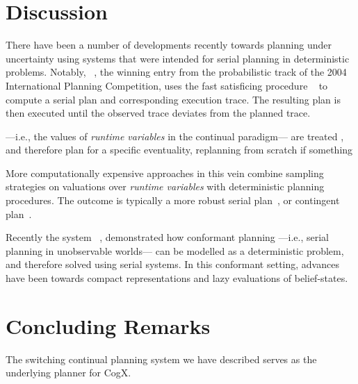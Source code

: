 \documentclass[letterpaper]{article}
\begin{document}
\section{Discussion}

There have been a number of developments recently towards planning
under uncertainty using systems that were intended for serial planning
in deterministic problems.  Notably,
~\cite{yoon:etal:2007}, the winning entry from the
probabilistic track of the 2004 International Planning Competition,
uses the fast satisficing procedure
~\cite{hoffmann:nebel:2001} to compute a serial plan and
corresponding execution trace. The resulting plan is then executed
until the observed trace deviates from the planned trace.

 ---i.e., the values of {\em
runtime variables} in the continual paradigm--- are treated , and
therefore plan for a specific eventuality, replanning from scratch if
something


More computationally expensive approaches in this vein combine
sampling strategies on valuations over {\em runtime variables} with
deterministic planning procedures. The outcome is typically a more
robust serial plan~\cite{yoon:etal:2008}, or contingent
plan~\cite{majercik:2006}.



Recently the system
~\cite{hoffmann:brafman:2006}, demonstrated how
conformant planning ---i.e., serial planning in unobservable worlds---
can be modelled as a deterministic problem, and therefore solved using
serial systems. In this conformant setting, advances have been towards
compact representations and lazy evaluations of belief-states.
 

\section{Concluding Remarks}

The switching continual planning system we have described serves as
the underlying planner for CogX. 




\end{document}
